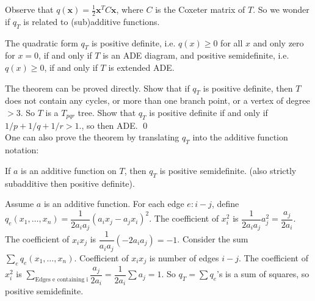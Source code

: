Observe that $q(\mathbf{x})= \frac{1}{2}\mathbf{x}^TC\mathbf{x}$, where $C$ is the Coxeter matrix of $T$. So we wonder if $q_T$ is related to (sub)additive functions. 

\begin{thm}
The quadratic form $q_T$ is positive definite, i.e. $q(x) \geq 0$ for all $x$ and only zero for $x=0$, if and only if $T$ is an ADE diagram, and positive semidefinite, i.e. $q(x) \geq 0$, if and only if $T$ is extended ADE. 
\end{thm}

The theorem can be proved directly. Show that if $q_T$ is positive definite, then $T$ does not contain any cycles, or more than one branch point, or a vertex of degree $>3$. So $T$ is a $T_{pqr}$ tree. Show that $q_T$ is positive definite if and only if $1/p+1/q+1/r>1$., so then ADE. \qed \\




One can also prove the theorem by translating $q_T$ into the additive function notation: 

\begin{prop}
If $a$ is an additive function on $T$, then $q_T$ is positive semidefinite. (also strictly subadditive then positive definite). 
\end{prop}

\pf Assume $a$ is an additive function. For each edge $e:i-j$, define $q_e(x_1,\ldots,x_n)= \dfrac{1}{2a_ia_j} (a_ix_j-a_jx_i)^2$. The coefficient of $x_i^2$ is $\dfrac{1}{2a_ia_j} a_j^2= \dfrac{a_j}{2a_i}$. The coefficient of $x_ix_j$ is $\dfrac{1}{a_ia_j} (-2a_ia_j)= -1$. Consider the sum $\sum_e q_e(x_1,\ldots,x_n)$. Coefficient of $x_ix_j$ is number of edges $i-j$. The coefficient of $x_i^2$ is $\sum_{\text{Edges e containing i}} \dfrac{a_j}{2a_i}= \dfrac{1}{2a_i} \sum a_j=1$. So $q_T= \sum q_e$'s is a sum of squares, so positive semidefinite. 

















